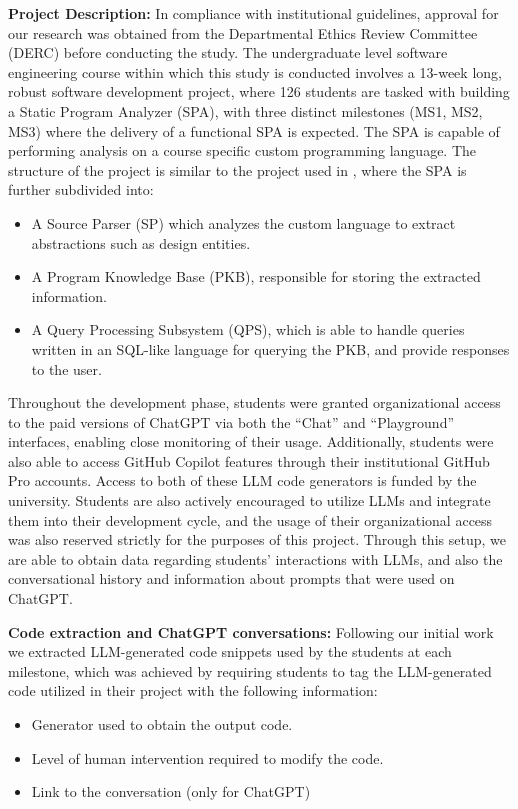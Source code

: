 \textbf{Project Description:}
In compliance with institutional guidelines, approval for our research was obtained from the Departmental Ethics Review Committee (DERC) before conducting the study. The undergraduate level software engineering course within which this study is conducted involves a 13-week long, robust software development project, where 126 students are tasked with building a Static Program Analyzer (SPA), with three distinct milestones (MS1, MS2, MS3) where the delivery of a functional SPA is expected. The SPA is capable of performing analysis on a course specific custom programming language. The structure of the project is similar to the project used in \cite{Rasnayaka2024}, where the SPA is further subdivided into:
\begin{itemize}
    \item A Source Parser (SP) which analyzes the custom language to extract abstractions such as design entities.
    \item A Program Knowledge Base (PKB), responsible for storing the extracted information.
    \item A Query Processing Subsystem (QPS), which is able to handle queries written in an SQL-like language for querying the PKB, and provide responses to the user.
\end{itemize}

Throughout the development phase, students were granted organizational access to the paid versions of ChatGPT via both the ``Chat'' and ``Playground'' interfaces, enabling close monitoring of their usage. Additionally, students were also able to access  GitHub Copilot features through their institutional GitHub Pro accounts. Access to both of these LLM code generators is funded by the university. Students are also actively encouraged to utilize LLMs and integrate them into their development cycle, and the usage of their organizational access was also reserved strictly for the purposes of this project. Through this setup, we are able to obtain data regarding students' interactions with LLMs, and also the conversational history and information about prompts that were used on ChatGPT.

\textbf{Code extraction and ChatGPT conversations:} Following our initial work~\cite{Rasnayaka2024} we extracted LLM-generated code snippets used by the students at each milestone, which was achieved by requiring students to tag the LLM-generated code utilized in their project with the following information:

\begin{itemize}
    \item Generator used to obtain the output code.
    \item Level of human intervention required to modify the code.
    \item Link to the conversation (only for ChatGPT)
\end{itemize}


